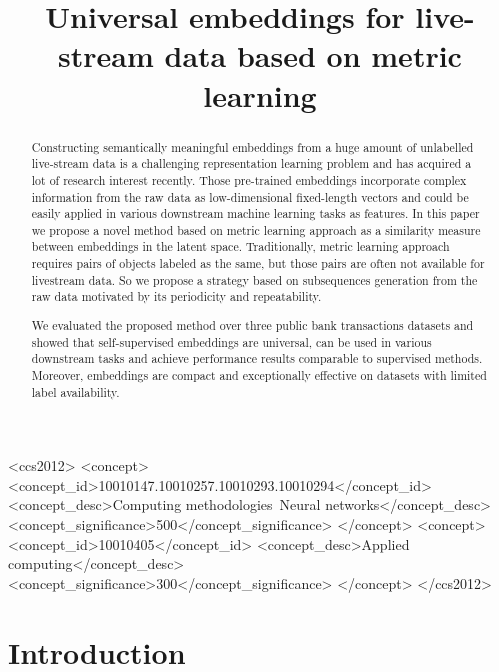 \documentclass[sigconf]{acmart}
\begin{document}
\title{Universal embeddings for live-stream data based on metric learning}

\begin{abstract}

Constructing semantically meaningful embeddings from a huge amount of unlabelled live-stream data is a challenging representation learning problem and has acquired a lot of research interest recently. Those pre-trained embeddings incorporate complex information from the raw data as low-dimensional fixed-length vectors and could be easily applied in various downstream machine learning tasks as features. In this paper we propose a novel method based on metric learning approach as a similarity measure between embeddings in the latent space. Traditionally, metric learning approach requires pairs of objects labeled as the same, but those pairs are often not available for livestream data. So we propose a strategy based on subsequences generation from the raw data motivated by its periodicity and repeatability. 

 We evaluated the proposed method over three public bank transactions datasets and showed that self-supervised embeddings are universal, can be used in various downstream tasks and achieve performance results comparable to supervised methods. Moreover, embeddings are compact and exceptionally effective on datasets with limited label availability. 


\end{abstract}

\begin{CCSXML}
<ccs2012>
<concept>
<concept_id>10010147.10010257.10010293.10010294</concept_id>
<concept_desc>Computing methodologies~Neural networks</concept_desc>
<concept_significance>500</concept_significance>
</concept>
<concept>
<concept_id>10010405</concept_id>
<concept_desc>Applied computing</concept_desc>
<concept_significance>300</concept_significance>
</concept>
</ccs2012>
\end{CCSXML}



\maketitle

\section{Introduction}
\end{document}
